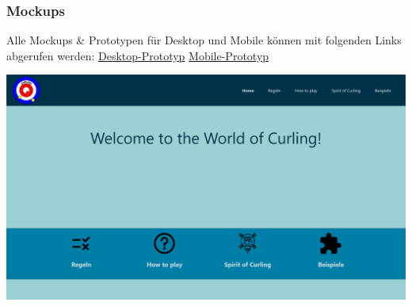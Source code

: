 \documentclass[11pt]{article}
\begin{document}
    \pagebreak

    \begin{landscape}
        \subsubsection{Mockups}

        Alle Mockups \& Prototypen für Desktop und Mobile können mit folgenden Links abgerufen werden:
        \href{https://xd.adobe.com/view/45d77867-36a0-4e18-aa80-e69ece38dc4d-1084/?fullscreen}{Desktop-Prototyp}\xspace
        \href{https://xd.adobe.com/view/e60b6f38-3978-4ad7-9356-911ad63d6317-b358/?fullscreen}{Mobile-Prototyp}

        \noindent
        \begin{minipage}{1.1\textwidth}
            \includegraphics[width=\linewidth]{media/home}
        \end{minipage}
        \begin{minipage}[c]{0.4\textwidth}
            \raggedleft

\end{minipage}
\end{landscape}
\end{document}
